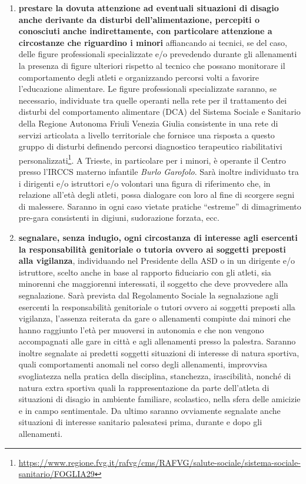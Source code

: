 \documentclass{djtsdoc}
\begin{document}
\begin{enumerate}
\begin{enumerate}
			\item \textbf{prestare la dovuta attenzione ad eventuali situazioni di disagio anche derivante da disturbi dell'alimentazione, percepiti o conosciuti anche indirettamente, con particolare attenzione a circostanze che riguardino i minori} affiancando ai tecnici, se del caso, delle figure professionali specializzate e/o prevedendo durante gli allenamenti la presenza di figure ulteriori rispetto al tecnico che possano monitorare il comportamento degli atleti e organizzando percorsi volti a favorire l'educazione alimentare. Le figure professionali specializzate saranno, se necessario, individuate tra quelle operanti nella rete per il trattamento dei disturbi del comportamento alimentare (DCA) del Sistema Sociale e Sanitario della Regione Autonoma Friuli Venezia Giulia consistente in una rete di servizi articolata a livello territoriale che fornisce una risposta a questo gruppo di disturbi definendo percorsi diagnostico terapeutico riabilitativi personalizzati\footnote{\href{https://www.regione.fvg.it/rafvg/cms/RAFVG/salute-sociale/sistema-sociale-sanitario/FOGLIA29/}{https://www.regione.fvg.it/rafvg/cms/RAFVG/salute-sociale/sistema-sociale-sanitario/FOGLIA29}}. A Trieste, in particolare per i minori, è operante il Centro presso l'IRCCS materno infantile \textit{Burlo Garofolo}. Sarà inoltre individuato tra i dirigenti e/o istruttori e/o volontari una figura di riferimento che, in relazione all'età degli atleti, possa dialogare con loro al fine di scorgere segni di malessere. Saranno in ogni caso vietate pratiche “estreme” di dimagrimento pre-gara consistenti in digiuni, sudorazione forzata, ecc.
			\item \textbf{segnalare, senza indugio, ogni circostanza di interesse agli esercenti la responsabilità genitoriale o tutoria ovvero ai soggetti preposti alla vigilanza}, individuando nel Presidente della ASD o in un dirigente e/o istruttore, scelto anche in base al rapporto fiduciario con gli atleti, sia minorenni che maggiorenni interessati, il soggetto che deve provvedere alla segnalazione. Sarà prevista dal Regolamento Sociale la segnalazione agli esercenti la responsabilità genitoriale o tutori ovvero ai soggetti preposti alla vigilanza, l'assenza reiterata da gare o allenamenti compiute dai minori che hanno raggiunto l'età per muoversi in autonomia e che non vengono accompagnati alle gare in città e agli allenamenti presso la palestra. Saranno inoltre segnalate ai predetti soggetti situazioni di interesse di natura sportiva, quali comportamenti anomali nel corso degli allenamenti, improvvisa svogliatezza nella pratica della disciplina, stanchezza, irascibilità, nonché di natura extra sportiva quali la rappresentazione da parte dell'atleta di situazioni di disagio in ambiente familiare, scolastico, nella sfera delle amicizie e in campo sentimentale. Da ultimo saranno ovviamente segnalate anche situazioni di interesse sanitario palesatesi prima, durante e dopo gli allenamenti.

\end{enumerate}
\end{enumerate}
\end{document}
